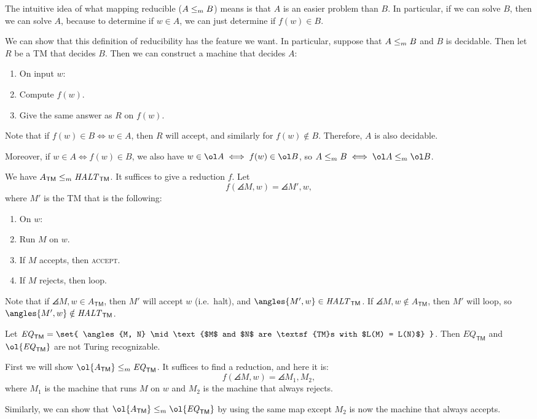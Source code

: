 \documentclass{standalone}
\begin{document}
The intuitive idea of what mapping reducible (\(A \mathrel{\leq_m} B\)) means is that \(A\) is an easier problem than \(B\). In particular, if we can solve \(B\), then we can solve \(A\), because to determine if \(w \in A\), we can just determine if \(f(w) \in B\).

We can show that this definition of reducibility has the feature we want. In particular, suppose that \(A \mathrel{\leq_m} B\) and \(B\) is decidable. Then let \(R\) be a \textsf{TM} that decides \(B\). Then we can construct a machine that decides \(A\):
\begin{enumerate}[start=0]
  \item On input \(w\):
  \item Compute \(f(w)\).
  \item Give the same answer as \(R\) on \(f(w)\).
\end{enumerate}
Note that if \(f(w) \in B \iff w \in A\), then \(R\) will accept, and similarly for \(f(w) \notin B\). Therefore, \(A\) is also decidable.

Moreover, if \(w \in A \iff f(w) \in B\), we also have \(w \in \ol A \iff f(w) \in \ol B\), so \(A \mapredu B \iff \ol A \mapredu \ol B\).


\begin{example}
  We have \(A_{\textsf{TM}} \mathrel{\leq_m} \mathit{HALT}_{\textsf{TM}}\).
  \tcblower
  It suffices to give a reduction \(f\). Let
  \[
    f(\angles{M, w}) = \angles{M', w},
  \]
  where \(M'\) is the \textsf{TM} that is the following:
  \begin{enumerate}[start=0]
    \item On \(w\):
    \item Run \(M\) on \(w\).
    \item If \(M\) accepts, then \textsc{accept}.
    \item If \(M\) rejects, then loop.
  \end{enumerate}

  Note that if \(\angles{M, w} \in A_{\textsf{TM}}\),
  then \(M'\) will accept \(w\) (i.e.\ halt),
  and \(\angles{M', w} \in \HALT_{\textsf{TM}}\).
  If \(\angles{M, w} \notin A_{\textsf{TM}}\),
  then \(M'\) will loop, so \(\angles{M', w} \notin \HALT_{\textsf{TM}}\).
\end{example}

\begin{example}
  Let \(\mathit{EQ}_{\textsf{TM}} = \set{
    \angles{M, N} \mid \text{$M$ and $N$ are \textsf{TM}s with $L(M) = L(N)$}
  }\). Then \(\mathit{EQ}_{\textsf{TM}}\) and \(\ol{\mathit{EQ}_{\textsf{TM}}}\) are not Turing recognizable.
  \tcblower
  
  First we will show \(\ol{A_{\textsf{TM}}} \mapredu \mathit{EQ}_{\textsf{TM}}\). It suffices to find a reduction, and here it is:
  \[
    f(\angles{M, w}) = \angles{M_1, M_2},
  \]
  where \(M_1\) is the machine that runs \(M\) on \(w\) and \(M_2\) is the machine that always rejects.

  Similarly, we can show that \(\ol{A_{\textsf{TM}}} \mapredu \ol{\mathit{EQ}_{\textsf{TM}}}\) by using the same map except \(M_2\) is now the machine that always accepts.
\end{example}
\end{document}
